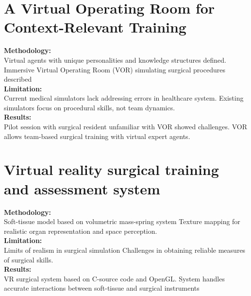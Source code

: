 \section{A Virtual Operating Room for Context-Relevant Training \cite{JournalArticle2}}
\textbf{Methodology:}\\
Virtual agents with unique personalities and knowledge structures defined. Immersive Virtual Operating Room (VOR) simulating surgical procedures described \\
\textbf{Limitation:}\\
Current medical simulators lack addressing errors in healthcare system. Existing simulators focus on procedural skills, not team dynamics.\\
\textbf{Results:}\\ Pilot session with surgical resident unfamiliar with VOR showed challenges. VOR allows team-based surgical training with virtual expert agents.

\section{Virtual reality surgical training and assessment system\cite{JournalArticle3}\cite{JournalArticle7}}
\textbf{Methodology:}\\ Soft-tissue model based on volumetric mass-spring system
Texture mapping for realistic organ representation and space perception.\\
\textbf{Limitation:}\\ Limits of realism in surgical simulation Challenges in obtaining reliable measures of surgical skills.\\
\textbf{Results:}\\ VR surgical system based on C-source code and OpenGL.
System handles accurate interactions between soft-tissue and surgical instruments
